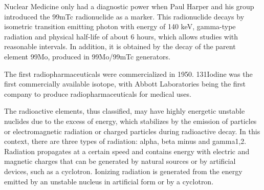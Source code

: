 \documentclass{article}
\begin{document}
Nuclear Medicine only had a diagnostic power when  Paul  Harper and  his group  introduced  the 99mTc radionuclide as a marker. This radionuclide decays by isometric transition emitting photon with energy  of  140  keV,  gamma-type  radiation  and physical half-life of about 6 hours, which allows studies with reasonable intervals. In addition, it is obtained by the decay of the parent element 99Mo, produced in 99Mo/99mTc generators.

The  first  radiopharmaceuticals  were commercialized  in  1950.  131Iodine  was  the  first commercially  available  isotope,  with  Abbott Laboratories being  the first company to  produce radiopharmaceuticals for medical uses.

The radioactive elements, thus classified, may have highly energetic unstable nuclides due to the excess of energy, which stabilizes by the emission of particles or electromagnetic radiation or charged particles during radioactive decay. In this context, there are three types of radiation: alpha, beta minus and  gamma1,2. Radiation  propagates at  a  certain speed  and  contains  energy  with  electric  and magnetic charges that can be generated by natural sources or by artificial devices, such as a cyclotron. Ionizing  radiation  is  generated  from  the  energy emitted by an unstable nucleus in artificial form or by a cyclotron.
\end{document}
